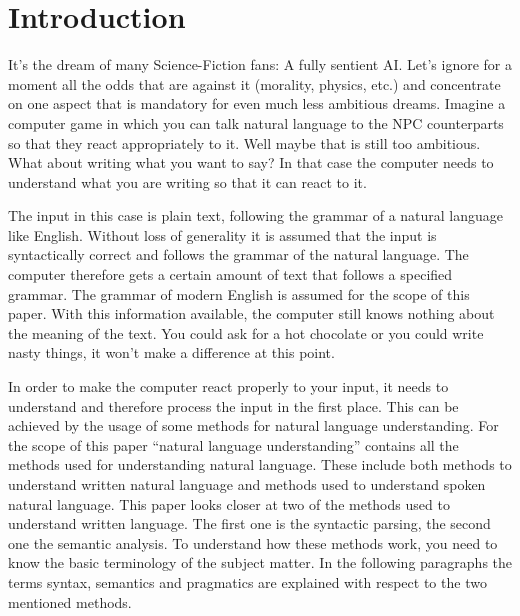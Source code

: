 \documentclass[12pt,twoside]{scrartcl}
\theoremstyle{plain}
\theoremstyle{definition}
\theoremstyle{remark}
\begin{document}


\section{Introduction}
\label{sec:introduction}

	It's the dream of many Science-Fiction fans: A fully sentient AI. Let's ignore for a moment all the odds that are against it (morality, physics, etc.) and concentrate on one aspect that is mandatory for even much less ambitious dreams. Imagine a computer game in which you can talk natural language to the NPC counterparts so that they react appropriately to it. Well maybe that is still too ambitious. What about writing what you want to say? In that case the computer needs to understand what you are writing so that it can react to it.
	
	The input in this case is plain text, following the grammar of a natural language like English. Without loss of generality it is assumed that the input is syntactically correct and follows the grammar of the natural language. The computer therefore gets a certain amount of text that follows a specified grammar. The grammar of modern English is assumed for the scope of this paper. With this information available, the computer still knows nothing about the meaning of the text. You could ask for a hot chocolate or you could write nasty things, it won't make a difference at this point.
	
	In order to make the computer react properly to your input, it needs to understand and therefore process the input in the first place. This can be achieved by the usage of some methods for natural language understanding. For the scope of this paper ``natural language understanding'' contains all the methods used for understanding natural language. These include both methods to understand written natural language and methods used to understand spoken natural language. This paper looks closer at two of the methods used to understand written language. The first one is the syntactic parsing, the second one the semantic analysis. To understand how these methods work, you need to know the basic terminology of the subject matter. In the following paragraphs the terms syntax, semantics and pragmatics are explained with respect to the two mentioned methods.
	
\end{document}
